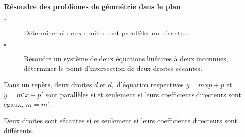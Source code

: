 \begin{titre}

\end{titre}



\begin{CpsCol}
\textbf{Résoudre des problèmes de géométrie dans le plan}
\begin{description}
\item[$\square$] Déterminer si deux droites sont parallèles ou sécantes.
\item[$\square$] Résoudre un système de deux équations linéaires à deux inconnues, déterminer le point d'intersection de deux droites sécantes.
\end{description}
\end{CpsCol}





\begin{Th}
Dans un repère, deux droites $d$ et $d_1$ d'équation respectives $y=mxp+p$ et $y=m'x+p'$ sont parallèles si et seulement si leurs coefficients directeurs sont égaux, $m=m'$.
\end{Th}


\begin{Rq}
Deux droites sont sécantes si et seulement si leurs coefficients directeurs sont différents.
\end{Rq}


\begin{minipage}{0.47\linewidth}




\end{minipage}
\hfill
\begin{minipage}{0.47\linewidth}



\end{minipage}



